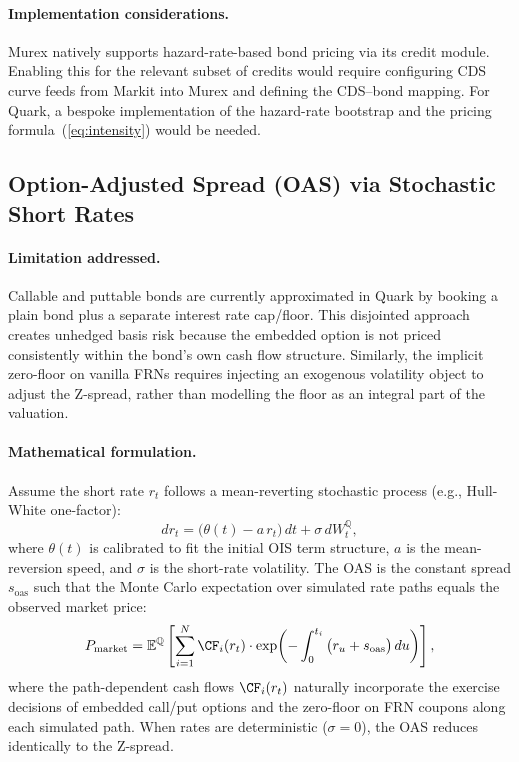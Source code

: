 \documentclass[reviewdoc]{pmv_report}  %
\begin{document}
\paragraph{Implementation considerations.}
Murex natively supports hazard-rate-based bond pricing via its credit module.
Enabling this for the relevant subset of credits would require configuring CDS curve feeds from Markit into Murex and defining the CDS--bond mapping.
For Quark, a bespoke implementation of the hazard-rate bootstrap and the pricing formula~(\ref{eq:intensity}) would be needed.

\subsection{Option-Adjusted Spread (OAS) via Stochastic Short Rates}\label{sec:OAS}

\paragraph{Limitation addressed.}
Callable and puttable bonds are currently approximated in Quark by booking a plain bond plus a separate interest rate cap/floor.
This disjointed approach creates unhedged basis risk because the embedded option is not priced consistently within the bond's own cash flow structure.
Similarly, the implicit zero-floor on vanilla FRNs requires injecting an exogenous volatility object to adjust the Z-spread, rather than modelling the floor as an integral part of the valuation.

\paragraph{Mathematical formulation.}
Assume the short rate $r_t$ follows a mean-reverting stochastic process (e.g., Hull-White one-factor):
\begin{equation}\label{eq:HullWhite}
  dr_t = \big(\theta(t) - a\, r_t\big)\, dt + \sigma\, dW^{\mathbb{Q}}_t,
\end{equation}
where $\theta(t)$ is calibrated to fit the initial OIS term structure, $a$ is the mean-reversion speed, and $\sigma$ is the short-rate volatility.
The OAS is the constant spread $s_{\text{oas}}$ such that the Monte Carlo expectation over simulated rate paths equals the observed market price:
\begin{equation}\label{eq:OAS}
  P_{\text{market}} = \mathbb{E}^{\mathbb{Q}} \left[ \sum_{i=1}^{N} \CF_i(r_t) \cdot \exp\!\left( -\int_0^{t_i} \big(r_u + s_{\text{oas}}\big)\, du \right) \right],
\end{equation}
where the path-dependent cash flows $\CF_i(r_t)$ naturally incorporate the exercise decisions of embedded call/put options and the zero-floor on FRN coupons along each simulated path.
When rates are deterministic ($\sigma = 0$), the OAS reduces identically to the Z-spread.
\end{document}
